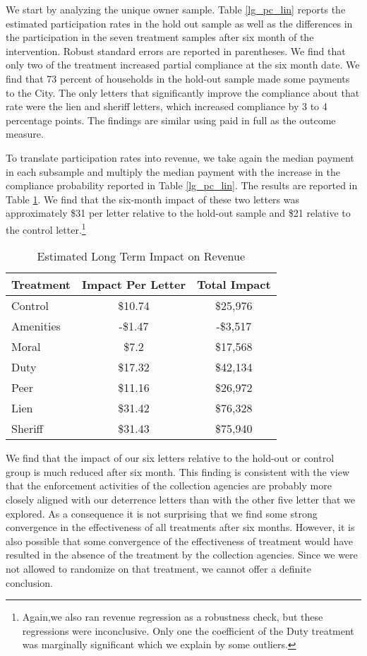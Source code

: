 \documentclass[12pt]{article}
\begin{document}
We start by analyzing the unique owner sample.  Table \ref{lg_pc_lin}
reports the estimated participation rates in the hold out sample as
well as the differences in the participation in the seven treatment
samples after six month of the intervention. Robust standard errors
are reported in parentheses. We find that only two of the treatment
increased partial compliance at the six month date.  We find that 73
percent of households in the hold-out sample made some payments to the
City. The only letters that significantly improve the compliance about
that rate were the lien and sheriff letters, which increased
compliance by 3 to 4 percentage points. The findings are similar using
paid in full as the outcome measure.

To translate participation rates into revenue, we take again the
median payment in each subsample and multiply the median payment with
the increase in the compliance probability reported in Table
\ref{lg_pc_lin}.  The results are reported in Table \ref{lg_rev}. We
find that the six-month impact of these two letters was approximately
\$31 per letter relative to the hold-out sample and \$21 relative to
the control letter.\footnote{Again,we also ran revenue regression as a 
robustness check, but these regressions were inconclusive. Only one 
the coefficient of the Duty treatment was marginally significant which we
explain by some outliers.}

\begin{table}[htbp]
\caption{Estimated Long Term Impact on Revenue} \label{lg_rev}
\bigskip
\centering
\begin{tabular}{lcc}
  \hline
Treatment & Impact Per Letter & Total Impact \\ 
  \hline
Control & \$10.74 & \$25,976 \\ 
  Amenities & -\$1.47 & -\$3,517 \\ 
  Moral & \$7.2 & \$17,568 \\ 
  Duty & \$17.32 & \$42,134 \\ 
  Peer & \$11.16 & \$26,972 \\ 
  Lien & \$31.42 & \$76,328 \\ 
  Sheriff & \$31.43 & \$75,940 \\ 
   \hline
\end{tabular}
\end{table}

We find that the impact of our six letters relative to the hold-out or
control group is much reduced after six month. This finding is
consistent with the view that the enforcement activities of the
collection agencies are probably more closely aligned with our
deterrence letters than with the other five letter that we
explored. As a consequence it is not surprising that we find some
strong convergence in the effectiveness of all treatments after six
months. However, it is also possible that some convergence of the
effectiveness of treatment would have resulted in the absence of the
treatment by the collection agencies. Since we were not allowed to
randomize on that treatment, we cannot offer a definite conclusion.
\end{document}
